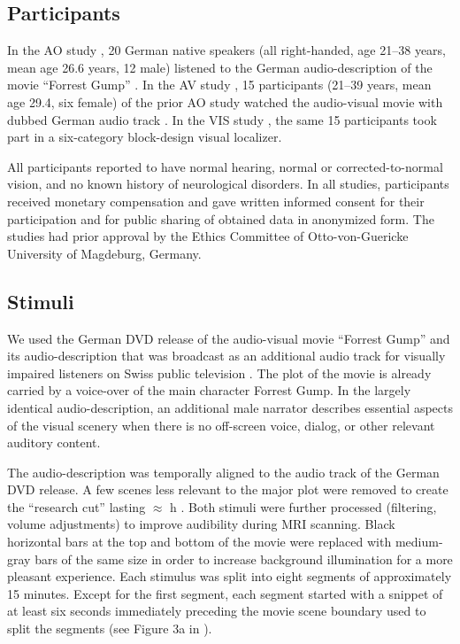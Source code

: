 \documentclass[english]{article}
\begin{document}
\subsection{Participants}
In the AO study \citep{hanke2014audiomovie}, 20 German native speakers (all
right-handed, age 21–38 years, mean age 26.6 years, 12 male) listened to the
German audio-description \citep{ForrestGumpGermanAD} of the movie ``Forrest
Gump'' \citep{ForrestGumpMovie}.
In the AV study \citep{hanke2016simultaneous}, 15 participants (21–39 years,
mean age 29.4, six female) of the prior AO study watched the audio-visual movie
with dubbed German audio track \citep{ForrestGumpDVD}.
In the VIS study \citep{sengupta2016extension}, the same 15 participants took
part in a six-category block-design visual localizer.

All participants reported to have normal hearing, normal or corrected-to-normal
vision, and no known history of neurological disorders.
In all studies, participants received monetary compensation and gave written
informed consent for their participation and for public sharing of obtained data
in anonymized form. The studies had prior approval by the Ethics Committee of
Otto-von-Guericke University of Magdeburg, Germany.


\subsection{Stimuli}
We used the German DVD release \citep{ForrestGumpDVD} of the audio-visual movie
``Forrest Gump'' \citep{ForrestGumpMovie} and its audio-description that was
broadcast as an additional audio track for visually impaired listeners on Swiss
public television \citep{ForrestGumpGermanAD}.
The plot of the movie is already carried by a voice-over of the main character
Forrest Gump.
In the largely identical audio-description, an additional male narrator
describes essential aspects of the visual scenery when there is no off-screen
voice, dialog, or other relevant auditory content.

The audio-description was temporally aligned to the audio track of the German
DVD release. A few scenes less relevant to the major plot were removed to create
the ``research cut'' lasting $\approx$ \unit[2]{h} \citep{hanke2014audiomovie,
hanke2016simultaneous}.
Both stimuli were further processed (filtering, volume adjustments) to improve
audibility during MRI scanning. Black horizontal bars at the top and bottom of
the movie were replaced with medium-gray bars of the same size in order to
increase background illumination for a more pleasant experience.
Each stimulus was split into eight segments of approximately 15 minutes. Except
for the first segment, each segment started with a snippet of at least six
seconds immediately preceding the movie scene boundary used to split the
segments (see Figure 3a in \citep{hanke2014audiomovie}).
\end{document}
